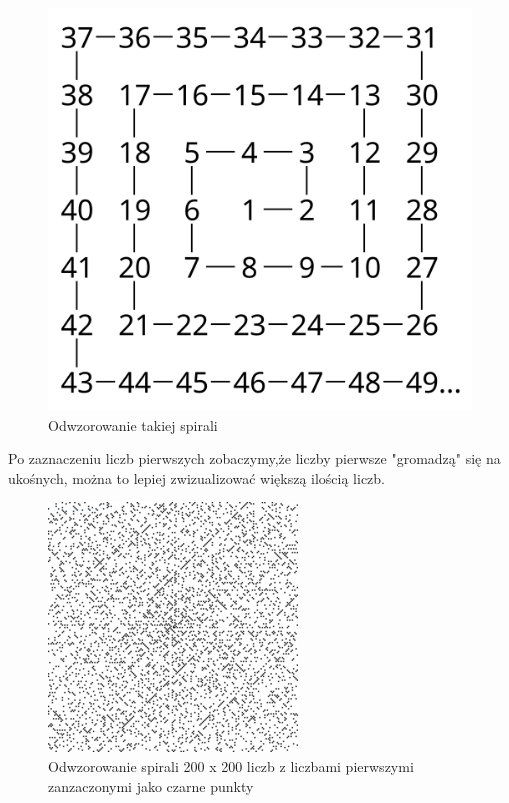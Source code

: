 \documentclass{article}
\begin{document}
\begin{figure}[htbp]

    \centering
    \includegraphics[scale=0.6]{pictures/zdjecia_kerem/u4.png}
    \caption{Odwzorowanie takiej spirali}
    \label{fig:spirala_ulama}
\end{figure}
\medskip
\hfill \break
Po zaznaczeniu liczb pierwszych zobaczymy,że liczby pierwsze "gromadzą" się na ukośnych, można to lepiej zwizualizować większą ilością liczb.
\begin{figure}[htbp]
    \centering
    \includegraphics[scale=0.8]{pictures/zdjecia_kerem/u2.png}
    \caption{Odwzorowanie spirali 200 x 200 liczb z liczbami pierwszymi zanzaczonymi jako czarne punkty}
    \centering
    \label{fig:spirala_ulama}
\end{figure}
\medskip
\hfill \break
\end{document}
